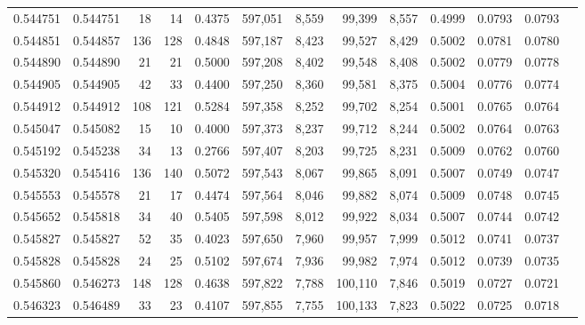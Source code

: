\begin{tabular}{rrrrrrrrrrrrr}
0.544751 & 0.544751 &    18 &    14 &                                     0.4375 & 597,051 &   8,559 &  99,399 &   8,557 & 0.4999 & 0.0793 & 0.0793 \\
0.544851 & 0.544857 &   136 &   128 &                                     0.4848 & 597,187 &   8,423 &  99,527 &   8,429 & 0.5002 & 0.0781 & 0.0780 \\
0.544890 & 0.544890 &    21 &    21 &                                     0.5000 & 597,208 &   8,402 &  99,548 &   8,408 & 0.5002 & 0.0779 & 0.0778 \\
0.544905 & 0.544905 &    42 &    33 &                                     0.4400 & 597,250 &   8,360 &  99,581 &   8,375 & 0.5004 & 0.0776 & 0.0774 \\
0.544912 & 0.544912 &   108 &   121 &                                     0.5284 & 597,358 &   8,252 &  99,702 &   8,254 & 0.5001 & 0.0765 & 0.0764 \\
0.545047 & 0.545082 &    15 &    10 &                                     0.4000 & 597,373 &   8,237 &  99,712 &   8,244 & 0.5002 & 0.0764 & 0.0763 \\
0.545192 & 0.545238 &    34 &    13 &                                     0.2766 & 597,407 &   8,203 &  99,725 &   8,231 & 0.5009 & 0.0762 & 0.0760 \\
0.545320 & 0.545416 &   136 &   140 &                                     0.5072 & 597,543 &   8,067 &  99,865 &   8,091 & 0.5007 & 0.0749 & 0.0747 \\
0.545553 & 0.545578 &    21 &    17 &                                     0.4474 & 597,564 &   8,046 &  99,882 &   8,074 & 0.5009 & 0.0748 & 0.0745 \\
0.545652 & 0.545818 &    34 &    40 &                                     0.5405 & 597,598 &   8,012 &  99,922 &   8,034 & 0.5007 & 0.0744 & 0.0742 \\
0.545827 & 0.545827 &    52 &    35 &                                     0.4023 & 597,650 &   7,960 &  99,957 &   7,999 & 0.5012 & 0.0741 & 0.0737 \\
0.545828 & 0.545828 &    24 &    25 &                                     0.5102 & 597,674 &   7,936 &  99,982 &   7,974 & 0.5012 & 0.0739 & 0.0735 \\
0.545860 & 0.546273 &   148 &   128 &                                     0.4638 & 597,822 &   7,788 & 100,110 &   7,846 & 0.5019 & 0.0727 & 0.0721 \\
0.546323 & 0.546489 &    33 &    23 &                                     0.4107 & 597,855 &   7,755 & 100,133 &   7,823 & 0.5022 & 0.0725 & 0.0718 \\

\end{tabular}
